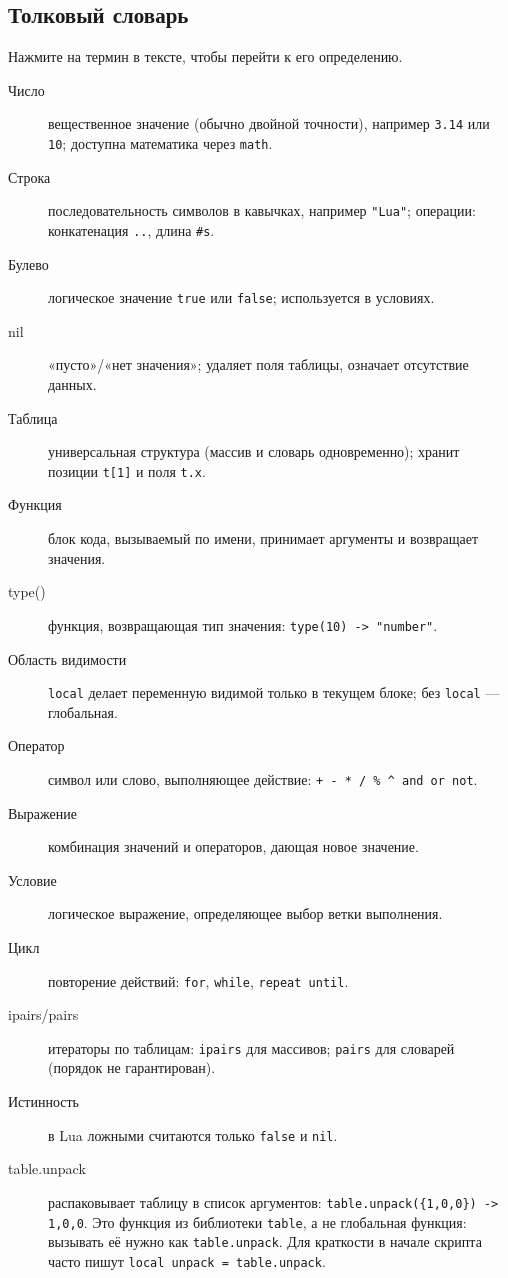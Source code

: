 \subsection{Толковый словарь}
Нажмите на термин в тексте, чтобы перейти к его определению.
\begin{description}
  \item[\hypertarget{term:number}{Число}] вещественное значение (обычно двойной точности), например \verb|3.14| или \verb|10|; доступна математика через \verb|math|.
  \item[\hypertarget{term:string}{Строка}] последовательность символов в кавычках, например \verb|"Lua"|; операции: конкатенация \verb|..|, длина \verb|#s|.
  \item[\hypertarget{term:boolean}{Булево}] логическое значение \verb|true| или \verb|false|; используется в условиях.
  \item[\hypertarget{term:nil}{nil}] «пусто»/«нет значения»; удаляет поля таблицы, означает отсутствие данных.
  \item[\hypertarget{term:table}{Таблица}] универсальная структура (массив и словарь одновременно); хранит позиции \verb|t[1]| и поля \verb|t.x|.
  \item[\hypertarget{term:function}{Функция}] блок кода, вызываемый по имени, принимает аргументы и возвращает значения.
  \item[\hypertarget{term:type}{type()}] функция, возвращающая тип значения: \verb|type(10) -> "number"|.
  \item[\hypertarget{term:scope}{Область видимости}] \verb|local| делает переменную видимой только в текущем блоке; без \verb|local| — глобальная.
  \item[\hypertarget{term:operator}{Оператор}] символ или слово, выполняющее действие: \verb|+ - * / % ^ and or not|.
  \item[\hypertarget{term:expression}{Выражение}] комбинация значений и операторов, дающая новое значение.
  \item[\hypertarget{term:condition}{Условие}] логическое выражение, определяющее выбор ветки выполнения.
  \item[\hypertarget{term:loop}{Цикл}] повторение действий: \verb|for|, \verb|while|, \verb|repeat until|.
  \item[\hypertarget{term:ipairs}{ipairs/pairs}] итераторы по таблицам: \verb|ipairs| для массивов; \verb|pairs| для словарей (порядок не гарантирован).
  \item[\hypertarget{term:truthiness}{Истинность}] в Lua ложными считаются только \verb|false| и \verb|nil|.
  \item[\hypertarget{term:unpack}{table.unpack}] распаковывает таблицу в список аргументов: \verb|table.unpack({1,0,0}) -> 1,0,0|. Это функция из библиотеки \verb|table|, а не глобальная функция: вызывать её нужно как \verb|table.unpack|. Для краткости в начале скрипта часто пишут \verb|local unpack = table.unpack|.
\end{description}

